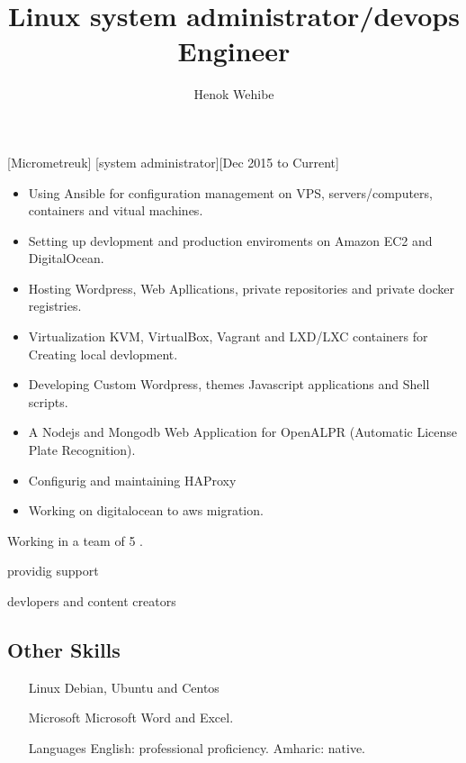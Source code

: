 \documentclass{article}
\title{Linux system administrator/devops Engineer}
\author{Henok Wehibe}
\begin{document}
\maketitle %

[Micrometreuk]
[system administrator][Dec 2015 to Current]

\begin{itemize}
\item Using Ansible for configuration management on VPS, servers/computers,  containers and vitual machines.
\item Setting up devlopment and production enviroments on Amazon EC2  and DigitalOcean.
\item Hosting Wordpress, Web Apllications, private repositories and private docker registries.
\item Virtualization  KVM, VirtualBox, Vagrant and LXD/LXC containers for Creating local devlopment.
\item Developing  Custom Wordpress, themes Javascript applications and Shell scripts. 
\item A Nodejs and Mongodb Web Application for OpenALPR (Automatic License Plate Recognition).
\item Configurig and maintaining  HAProxy 
\item Working on digitalocean to aws migration.
\end{itemize}


\begin{flushleft}

\par Working in a team of 5 . 

\par providig support 

\par devlopers and content creators




\end{flushleft}



\subsection{Other Skills}
\begin{itemize}
\item [Linux]Debian, Ubuntu and Centos
\item[Microsoft]Microsoft Word and Excel.
\item[Languages]English: professional proficiency.  Amharic: native.
\end{itemize}
\end{document}
